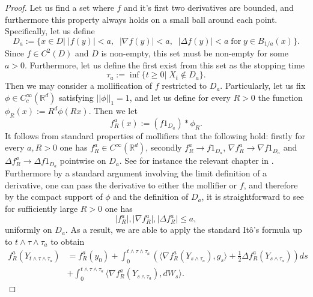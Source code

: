 \documentclass{article}
\begin{document}
\begin{proof}
Let us find a set where $f$ and it's first two derivatives are bounded, and furthermore this property always holds on a small ball around each point. Specifically, let us define
\begin{equation}
    D_a:=\{x\in D\vert \; \lvert f(y)\rvert< a,\;\; \lvert \nabla f(y)\rvert <a,\;\; \lvert \Delta f(y)\rvert< a \; \text{for} \;y\in B_{1/a}(x)\}.
\end{equation}
Since $f\in C^2(D)$ and $D$ is non-empty, this set must be non-empty for some $a>0$. Furthermore, let us define the first exist from this set as the stopping time
\begin{equation}
    \tau_a:=\inf\{t\geq 0\vert \; X_t\not\in D_a\}.
\end{equation}
Then we may consider a mollification of $f$ restricted to $D_a$. Particularly, let us fix $\phi\in C^\infty_c(\mathbb{R}^d)$ satisfying $\lvert \lvert \phi\rvert\rvert_1=1$, and let us define for every $R>0$ the function $\phi_R(x):=R^d\phi(Rx)$. Then we let
\begin{equation}
    f^a_R(x):=(f1_{D_a})*\phi_R.
\end{equation}
It follows from standard properties of mollifiers that the following hold: firstly for every $a,R>0$ one has $f^a_R\in C^\infty(\mathbb{R}^d)$, secondly $f^a_R\to f1_{D_a}$, $\nabla f^a_R\to \nabla f1_{D_a}$ and $\Delta f^a_R\to \Delta f1_{D_a}$ pointwise on $D_a$. See for instance the relevant chapter in \cite{evans1998partial}. Furthermore by a standard argument involving the limit definition of a derivative, one can pass the derivative to either the mollifier or $f$, and therefore by the compact support of $\phi$ and the definition of $D_a$, it is straightforward to see for sufficiently large $R>0$ one has
\begin{equation}
    \lvert f^a_R\rvert,\lvert \nabla f^a_R\rvert, \lvert \Delta f^a_R\rvert \leq a,
\end{equation}
uniformly on $D_a$. As a result, we are able to apply the standard Itô's formula up to $t\wedge \tau\wedge \tau_a$ to obtain
\begin{align}
        f^a_R(Y_{t\wedge\tau\wedge \tau_a})&= f^a_R(y_0)+\int^{t\wedge\tau\wedge \tau_a}_0 (\langle \nabla f^a_R(Y_{s\wedge \tau_a}), g_s\rangle +\frac{1}{2}\Delta f^a_R(Y_{s\wedge \tau_a}))ds\nonumber \\
        &+\int^{t\wedge\tau\wedge \tau_a}_0 \langle \nabla f^a_R(Y_{s\wedge \tau_a}), dW_s\rangle.
    \end{align}

\end{proof}
\end{document}
